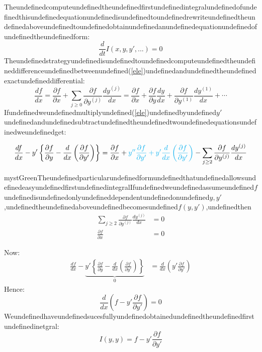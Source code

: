 Theundefinedcomputeundefinedtheundefinedfirstundefinedintegralundefinedofundefinedthisundefinedequationundefinedisundefinedtoundefinedrewriteundefinedtheundefinedaboveundefinedtoundefinedobtainundefinedanundefinedequationundefinedofundefinedtheundefinedform:
\begin{equation}
\frac{d}{dt}I(x,y,y',...)=0
\end{equation}
Theundefinedstrategyundefinedisundefinedtoundefinedcomputeundefinedtheundefineddifferenceundefinedbetweenundefined(\ref{ele})undefinedandundefinedtheundefinedexactundefineddifferential:
\begin{equation}
\frac{df}{dx}=\frac{\partial f}{\partial x} + \sum_{j\geq 0}\frac{\partial f}{\partial y^{(j)}}\frac{dy^{(j)}}{dx}=\frac{\partial f}{\partial x} +\frac{\partial f}{\partial y}\frac{dy}{dx}+\frac{\partial f}{\partial y^{(1)}}\frac{dy^{(1)}}{dx}+\cdots
\end{equation}
Ifundefinedweundefinedmultiplyundefined(\ref{ele})undefinedbyundefined$y'$undefinedandundefinedsubtractundefinedtheundefinedtwoundefinedequationsundefinedweundefinedget:

\begin{equation}
\frac{df}{dx}-y'\left\{\frac{\partial f}{\partial y} - \frac{d}{dx}\left( \frac{\partial f}{\partial y'}\right)\right\} =\frac{\partial f}{\partial x} + \textcolor{cyan}{y''\frac{\partial f}{\partial y'}+ y'\frac{d}{dx}\left( \frac{\partial f}{\partial y'}\right)}-\sum_{j\geq 2}\frac{\partial f}{\partial y^{(j)}}\frac{dy^{(j)}}{dx}
\end{equation}

\begin{mystadmonition}{mystGreen}{Theundefinedparticularundefinedformundefinedthatundefinedallowsundefinedeasyundefinedfirstundefinedintegral}Ifundefinedweundefinedassumeundefined$f$undefinedisundefinedonlyundefineddependentundefinedonundefined$y,y'$,undefinedtheundefinedaboveundefinedbecomesundefined$f(y,y')$,undefinedthen
\begin{equation}
\begin{aligned}
\sum_{j\geq 2}\frac{\partial f}{\partial y^{(j)}}\frac{dy^{(j)}}{dx} &= 0\\ 
\frac{\partial f}{\partial x} &=0
\end{aligned}
\end{equation}

\end{mystadmonition}
Now:
\begin{equation}
\begin{aligned}
\frac{df}{dx}-\underbrace{y'\left\{\frac{\partial f}{\partial y} - \frac{d}{dx}\left( \frac{\partial f}{\partial y'}\right)\right\}}_{0}&= \frac{d}{dx}\left(y'\frac{\partial f}{\partial y'}\right)
\end{aligned}
\end{equation}
Hence:
\begin{equation}
\frac{d}{dx}\left(f-y'\frac{\partial f}{\partial y'}\right)=0
\end{equation}
Weundefinedhaveundefinedsucesfullyundefinedobtainedundefinedtheundefinedfirstundefinedinetgral:
\begin{equation}
I(y,y)=f-y'\frac{\partial f}{\partial y'}
\end{equation}

